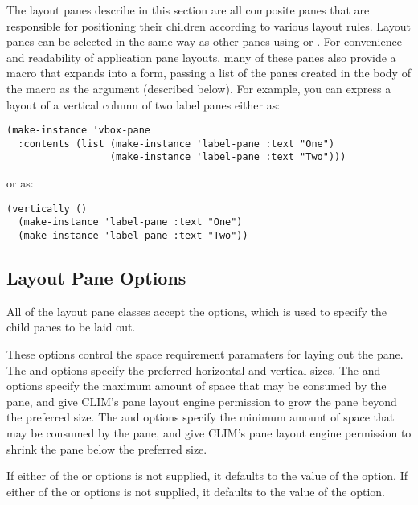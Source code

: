 The layout panes describe in this section are all composite panes that are
responsible for positioning their children according to various layout rules.
Layout panes can be selected in the same way as other panes using 
or .  For convenience and readability of application pane
layouts, many of these panes also provide a macro that expands into a
 form, passing a list of the panes created in the body of the
macro as the  argument (described below).  For example, you can
express a layout of a vertical column of two label panes either as:

\begin{verbatim}
(make-instance 'vbox-pane
  :contents (list (make-instance 'label-pane :text "One")
                  (make-instance 'label-pane :text "Two")))
\end{verbatim}

or as:

\begin{verbatim}
(vertically ()
  (make-instance 'label-pane :text "One")
  (make-instance 'label-pane :text "Two"))
\end{verbatim}


\subsection {Layout Pane Options}


All of the layout pane classes accept the  options, which is used
to specify the child panes to be laid out.


These options control the space requirement paramaters for laying out the pane.
The  and  options specify the preferred horizontal and
vertical sizes.  The  and  options specify the
maximum amount of space that may be consumed by the pane, and give CLIM's pane
layout engine permission to grow the pane beyond the preferred size.  The
 and  options specify the minimum amount of space
that may be consumed by the pane, and give CLIM's pane layout engine permission
to shrink the pane below the preferred size.

If either of the  or  options is not supplied, it
defaults to the value of the  option.  If either of the
 or  options is not supplied, it defaults to the
value of the  option.

